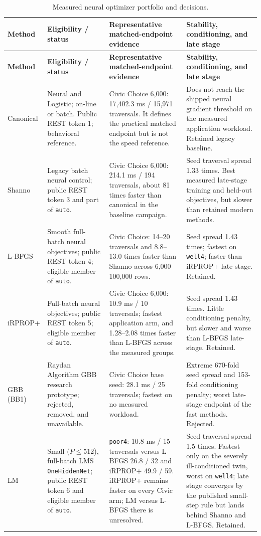 \small
\begin{longtable}{|>{\raggedright\arraybackslash}p{0.72in}|>{\raggedright\arraybackslash}p{1.15in}|>{\raggedright\arraybackslash}p{1.72in}|>{\raggedright\arraybackslash}p{1.72in}|}
\caption{Measured neural optimizer portfolio and decisions.\label{tab:optimizer-comparison}}\\
\hline
\textbf{Method} & \textbf{Eligibility / status} & \textbf{Representative matched-endpoint evidence} & \textbf{Stability, conditioning, and late stage} \\ \hline
\endfirsthead
\hline
\textbf{Method} & \textbf{Eligibility / status} & \textbf{Representative matched-endpoint evidence} & \textbf{Stability, conditioning, and late stage} \\ \hline
\endhead
Canonical & Neural and Logistic; on-line or batch. Public REST token 1; behavioral reference. & Civic Choice 6,000: 17,402.3 ms / 15,971 traversals. It defines the practical matched endpoint but is not the speed reference. & Does not reach the shipped neural gradient threshold on the measured application workload. Retained legacy baseline. \\ \hline
Shanno & Legacy batch neural control; public REST token 3 and part of \texttt{auto}. & Civic Choice 6,000: 214.1 ms / 194 traversals, about 81 times faster than canonical in the baseline campaign. & Seed traversal spread 1.33 times. Best measured late-stage training and held-out objectives, but slower than retained modern methods. \\ \hline
L-BFGS & Smooth full-batch neural objectives; public REST token 4; eligible member of \texttt{auto}. & Civic Choice: 14--20 traversals and 8.8--13.0 times faster than Shanno across 6,000--100,000 rows. & Seed spread 1.43 times; fastest on \texttt{well4}; faster than iRPROP+ late-stage. Retained. \\ \hline
iRPROP+ & Full-batch neural objectives; public REST token 5; eligible member of \texttt{auto}. & Civic Choice 6,000: 10.9 ms / 10 traversals; fastest application arm, and 1.28--2.08 times faster than L-BFGS across the measured groups. & Seed spread 1.43 times. Little conditioning penalty, but slower and worse than L-BFGS late-stage. Retained. \\ \hline
GBB (BB1)\index{Barzilai-Borwein!rejected research candidate} & Raydan Algorithm GBB research prototype; rejected, removed, and unavailable. & Civic Choice base seed: 28.1 ms / 25 traversals; fastest on no measured workload. & Extreme 670-fold seed spread and 153-fold conditioning penalty; worst late-stage endpoint of the fast methods. Rejected. \\ \hline
LM & Small ($P\leq512$), full-batch LMS \texttt{OneHiddenNet}; public REST token 6 and eligible member of \texttt{auto}. & \texttt{poor4}: 10.8 ms / 15 traversals versus L-BFGS 26.8 / 32 and iRPROP+ 49.9 / 59. iRPROP+ remains faster on every Civic arm; LM versus L-BFGS there is unresolved. & Seed traversal spread 1.5 times. Fastest only on the severely ill-conditioned twin, worst on \texttt{well4}; late stage converges by the published small-step rule but lands behind Shanno and L-BFGS. Retained. \\ \hline
\end{longtable}
\normalsize

